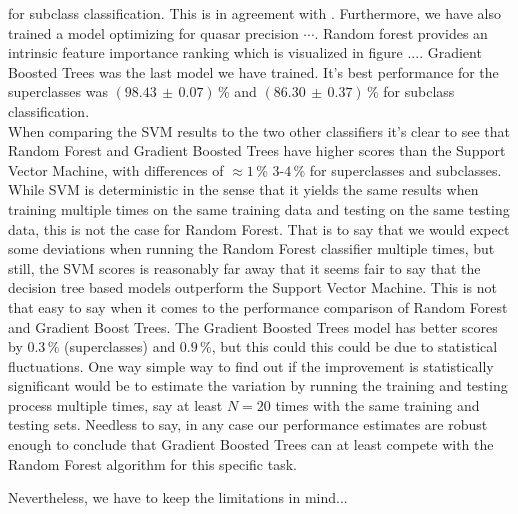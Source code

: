 for subclass classification. This is in agreement with \citet{kim2014}. Furthermore, we have also trained a model optimizing for quasar precision $\cdots$. Random forest provides an intrinsic feature importance ranking which is visualized in figure .... Gradient Boosted Trees was the last model we have trained. It's best performance for the superclasses was $(98.43 \, \pm \, 0.07) \, \%$ and $(86.30 \, \pm \, 0.37) \, \%$ for subclass classification.\\ 

When comparing the SVM results to the two other classifiers it's clear to see that Random Forest and Gradient Boosted Trees have higher scores than the Support Vector Machine, with differences of $\approx 1 \, \%$ \resp $3$-$4 \, \%$ for superclasses and subclasses. While SVM is deterministic in the sense that it yields the same results when training multiple times on the same training data and testing on the same testing data, this is not the case for Random Forest. That is to say that we would expect some deviations when running the Random Forest classifier multiple times, but still, the SVM scores is reasonably far away that it seems fair to say that the decision tree based models outperform the Support Vector Machine. This is not that easy to say when it comes to the performance comparison of Random Forest and Gradient Boost Trees. The Gradient Boosted Trees model has better scores by $0.3 \, \%$ (superclasses) and $0.9 \, \%$, but this could this could be due to statistical fluctuations. One way simple way to find out if the improvement is statistically significant would be to estimate the variation by running the training and testing process multiple times, say at least $N = 20$ times with the same training and testing sets. Needless to say, in any case our performance estimates are robust enough to conclude that Gradient Boosted Trees can at least compete with the Random Forest algorithm for this specific task.




Nevertheless, we have to keep the limitations in mind...

